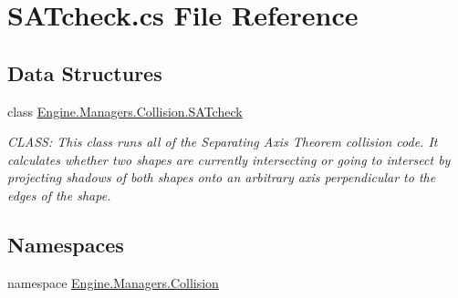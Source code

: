 \hypertarget{a00164}{}\section{S\+A\+Tcheck.\+cs File Reference}
\label{a00164}
\subsection*{Data Structures}
\begin{DoxyCompactItemize}
\item 
class \hyperlink{a00510}{Engine.\+Managers.\+Collision.\+S\+A\+Tcheck}
\begin{DoxyCompactList}\small\item\em C\+L\+A\+SS\+: This class runs all of the Separating Axis Theorem collision code. It calculates whether two shapes are currently intersecting or going to intersect by projecting shadows of both shapes onto an arbitrary axis perpendicular to the edges of the shape. \end{DoxyCompactList}\end{DoxyCompactItemize}
\subsection*{Namespaces}
\begin{DoxyCompactItemize}
\item 
namespace \hyperlink{a00268}{Engine.\+Managers.\+Collision}
\end{DoxyCompactItemize}
